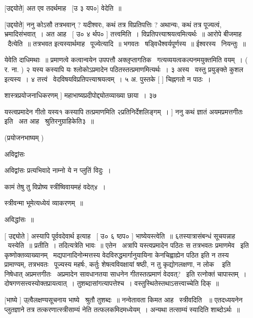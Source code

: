 \documentclass[11pt, openany]{book}
\begin{document}
 [उद्दयोते] अत एव तदर्थमाह \textendash\ [उ ३ यप०] वेदेति~॥ 

 [उद्दयोते] ननु कोऽसौ तत्रभवान् ? यदीश्वरः, कथं तत्र
विप्रतिपत्तिः ? अथान्यः, कथं तत्र पूज्यत्वं, भ्रमादिसंभवात्~। अत आह \textendash\ [
उ० ४ र्थप० ] तत्त्वमिति~। विप्रतिपत्त्याश्रयत्वमित्यर्थः~॥ आरोपे
बीजमाह \textendash\ दैत्येति~॥ तत्रभवत इत्यस्यार्थमाह \textendash\ पूज्येत्यादि~॥
भगवतः \textendash\ षड्विधैश्वर्यपूर्णस्य~॥ ईश्वरस्य \textendash\ नियन्तुः~॥ 



येवेति दाधिमथाः~॥ प्रमाणत्वे कत्वान्वयेन उपपत्तौ अक्लृप्तागतिक \textendash\ 
गत्यव्ययत्वकल्पनमयुक्तमिति वयम्~। ( र. ना. ) २ यस्य कस्यापि यः
श्लोकोऽप्रमादेन पठितस्तत्प्रमाणमित्यर्थः~। ३ अस्य \textendash\ यस्तु प्रयुङ्क्ते कुशल
इत्यस्य~। ४ तत्त्वं \textendash\ वेदविषयविप्रतिपत्त्याश्रयत्वम्~। ५ अ. पुस्तके [
] चिह्नगतो न पाठः~। 

शास्त्रप्रयोजनाधिकरणम् ] महाभाष्यप्रदीपोद्द्योतव्याख्या छाया~। ३७



यस्त्वप्रमादेन गीतो यस्य१ कस्यापि तत्प्रमाणमिति २प्रतिनिर्देशलिङ्गम्~। 
] ननु कथं ज्ञातं अयमप्रमत्तगीतः इति \textendash\ अत आह \textendash\ श्रुतिरनुग्राहिकेति३~॥ 

 (प्रयोजनभाष्यम् ) 

अविद्वांसः \textendash\ 

अविद्वांसः प्रत्यभिवादे नाम्नो ये न प्लुतिं विदुः~। 

कामं तेषु तु विप्रोष्य स्त्रीष्विवायमहं वदेत्४~। 

स्त्रीवन्मा भूमेत्यध्येयं व्याकरणम्~॥ 

अविद्धांसः~॥ 



 [ उद्द्योते ] अस्यापि पूर्ववदेवार्थ इत्याह \textendash\ [ उ० ६ ष्ठप० ]
भाष्येयस्त्वेति~॥ ६तस्यात्रासंबन्धं सूचयन्नाह \textendash\ यस्येति~॥ प्रतीति~। 
तदित्यत्रेति भावः~॥ एतेन \textendash\ अत्रापि यस्त्वप्रमादेन पठितः स तत्रभवतः
प्रमाणमेव \textendash\ इति कृष्णोक्तव्याख्यानम् \textendash\ {\qt मद्यपानादिनोन्मत्तस्य}
वेदविरुद्धमार्गानुयायिना केनचिह्वाह्येन पठित इति न तस्य प्रामाण्यम्,
तत्रभवतः \textendash\ पूज्यस्य महर्षः, कर्तुः शेषत्वविवक्षायां षष्ठी, न तु
कृद्योगलक्षणा, {\qt न लोक \textendash\ } इति निषेधात् अप्रमत्तगीतः \textendash\ अप्रमादेन
{\qt सावधानतया साधनेन गीतस्तत्प्रमाणं वेदवत्?} \textendash\ इति रत्नोक्तं चापास्तम्~। 
दोषगणसत्त्वस्योक्तप्रायत्वात्~। तुशब्दासांगत्यापत्तेश्च~। 
वस्तुस्थितेस्तथाऽसत्त्वाच्चेति दिक्~॥ 

 [भाष्ये ] उ्त्वैलक्षण्यसूचनाय भाष्ये \textendash\ श्रुतौ तुशब्दः~॥ नन्वेतावता
किमत आह \textendash\ स्त्रीवदिति ~॥ एतदध्ययनेन प्लुतज्ञाने तत्र तत्करणात्स्त्रीसाम्यं
नेति तत्फलकमिदमध्येयम्~। अन्यथा तत्साम्यं स्यादिति शाब्दोऽर्थः~॥ 
\end{document}
